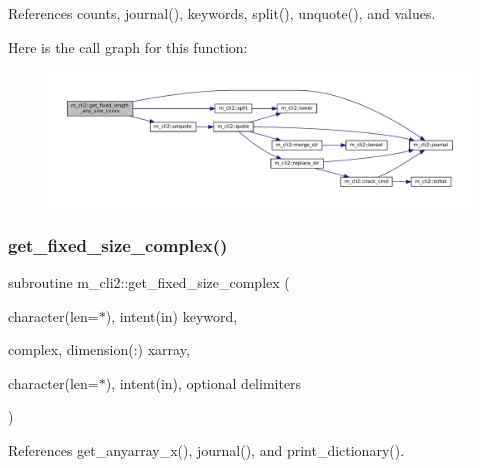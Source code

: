 References counts, journal(), keywords, split(), unquote(), and values.

Here is the call graph for this function\+:\nopagebreak
\begin{figure}[H]
\begin{center}
\leavevmode
\includegraphics[width=350pt]{namespacem__cli2_abc31389c45dcd95b8db641b59b98b447_cgraph}
\end{center}
\end{figure}
\mbox{\label{namespacem__cli2_a32b78784e20e29bf40f17e16d08336fa}} 
\subsubsection{\texorpdfstring{get\+\_\+fixed\+\_\+size\+\_\+complex()}{get\_fixed\_size\_complex()}}
{\footnotesize\ttfamily subroutine m\+\_\+cli2\+::get\+\_\+fixed\+\_\+size\+\_\+complex (\begin{DoxyParamCaption}\item[{character(len=$\ast$), intent(in)}]{keyword,  }\item[{complex, dimension(\+:)}]{xarray,  }\item[{character(len=$\ast$), intent(in), optional}]{delimiters }\end{DoxyParamCaption})\hspace{0.3cm}{\ttfamily [private]}}



References get\+\_\+anyarray\+\_\+x(), journal(), and print\+\_\+dictionary().

